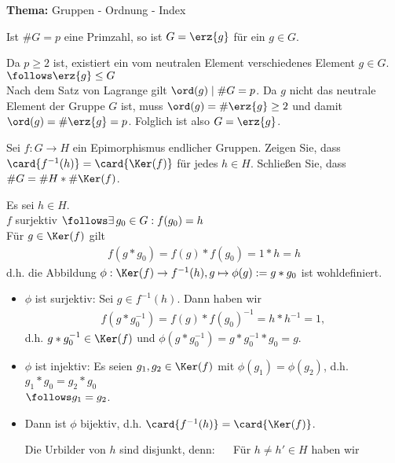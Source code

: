 \begin{uebungsblatt}
\textbf{Thema:} Gruppen - Ordnung - Index
\vspace{0.5cm}
%
\setcounter{taskcount}{5}
%
\begin{uebung}
	Ist $\# G = p$ eine Primzahl, so ist $G = \erz{g}$ für ein $g \in G$.
\end{uebung}
\begin{loesung}
	Da $p \geq 2$ ist, existiert ein vom neutralen Element verschiedenes Element $g \in G$. \\
	$\follows \erz{g} \leq G$ \\
	Nach dem Satz von Lagrange gilt $\ord(g) \mid \# G = p$. Da $g$ nicht das neutrale Element der Gruppe $G$ ist, muss $\ord(g) = \# \erz{g} \geq 2$  und damit $\ord(g) = \# \erz{g} = p$. Folglich ist also $G = \erz{g}$.
\end{loesung}
%
\begin{uebung}
	Sei $f: G \to H$ ein Epimorphismus endlicher Gruppen. Zeigen Sie, dass $\card{f^{-1}(h)} = \card{\Ker(f)}$ für jedes $h \in H$. Schließen Sie, dass $\# G = \# H * \# \Ker(f)$.
\end{uebung}
\begin{loesung}
	Es sei $h \in H$. \\
	$f$ surjektiv $\follows \exists \, g_0 \in G : f(g_0)=h$ \\
	Für $g \in \Ker (f)$ gilt 
	\begin{align*}
		f(g*g_0) = f(g) * f(g_0) = 1 * h = h
	\end{align*}
	d.h. die Abbildung $\phi :  \Ker(f) \to f^{-1}(h), g \mapsto \phi(g) := g * g_0$ ist wohldefiniert.
	\begin{itemize}
		\item $\phi$ ist surjektiv: Sei $g \in f^{-1}(h)$. Dann haben wir
		\begin{align*}
			f(g*g_0^{-1}) = f(g) * f(g_0)^{-1} = h * h^{-1} = 1,
		\end{align*}
		d.h. $g*g_0^{-1} \in \Ker(f)$ und $\phi(g*g_0^{-1})=g*g_0^{-1}*g_0 = g$.
		\item $\phi$ ist injektiv: Es seien $g_1,g_2 \in \Ker(f)$ mit $\phi(g_1) = \phi(g_2)$, d.h. $g_1 * g_0 = g_2 * g_0$ \\
		$\follows g_1 = g_2$.
		\item Dann ist $\phi$ bijektiv, d.h. $\card{f^{-1}(h)} = \card{\Ker(f)}$. \par \medskip
		Die Urbilder von $h$ sind disjunkt, denn: $\quad$
		Für $h \neq h' \in H$ haben wir

\end{itemize}
\end{loesung}
\end{uebungsblatt}

